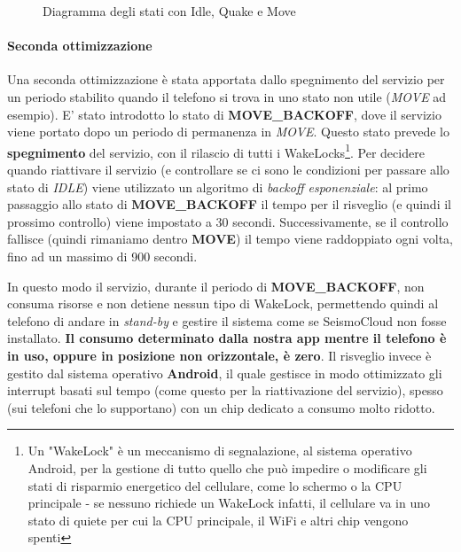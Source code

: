\documentclass[a4paper,10pt]{memoir}
\begin{document}
\begin{figure}[ht]
\centering
\label{fig:scs_sm1}
\caption{Diagramma degli stati con Idle, Quake e Move}
\end{figure}

\paragraph{Seconda ottimizzazione} Una seconda ottimizzazione è stata apportata dallo spegnimento del servizio per un periodo stabilito quando il telefono si trova in uno stato non utile (\textit{MOVE} ad esempio). E' stato introdotto lo stato di \textbf{MOVE\_BACKOFF}, dove il servizio viene portato dopo un periodo di permanenza in \textit{MOVE}. Questo stato prevede lo \textbf{spegnimento} del servizio, con il rilascio di tutti i WakeLocks\footnote{Un "WakeLock" è un meccanismo di segnalazione, al sistema operativo Android, per la gestione di tutto quello che può impedire o modificare gli stati di risparmio energetico del cellulare, come lo schermo o la CPU principale - se nessuno richiede un WakeLock infatti, il cellulare va in uno stato di quiete per cui la CPU principale, il WiFi e altri chip vengono spenti}. Per decidere quando riattivare il servizio (e controllare se ci sono le condizioni per passare allo stato di \textit{IDLE}) viene utilizzato un algoritmo di \textit{backoff esponenziale}: al primo passaggio allo stato di \textbf{MOVE\_BACKOFF} il tempo per il risveglio (e quindi il prossimo controllo) viene impostato a 30 secondi. Successivamente, se il controllo fallisce (quindi rimaniamo dentro \textbf{MOVE}) il tempo viene raddoppiato ogni volta, fino ad un massimo di 900 secondi.

In questo modo il servizio, durante il periodo di \textbf{MOVE\_BACKOFF}, non consuma risorse e non detiene nessun tipo di WakeLock, permettendo quindi al telefono di andare in \textit{stand-by} e gestire il sistema come se SeismoCloud non fosse installato. \textbf{Il consumo determinato dalla nostra app mentre il telefono è in uso, oppure in posizione non orizzontale, è zero}. Il risveglio invece è gestito dal sistema operativo \textbf{Android}, il quale gestisce in modo ottimizzato gli interrupt basati sul tempo (come questo per la riattivazione del servizio), spesso (sui telefoni che lo supportano) con un chip dedicato a consumo molto ridotto.
\end{document}
